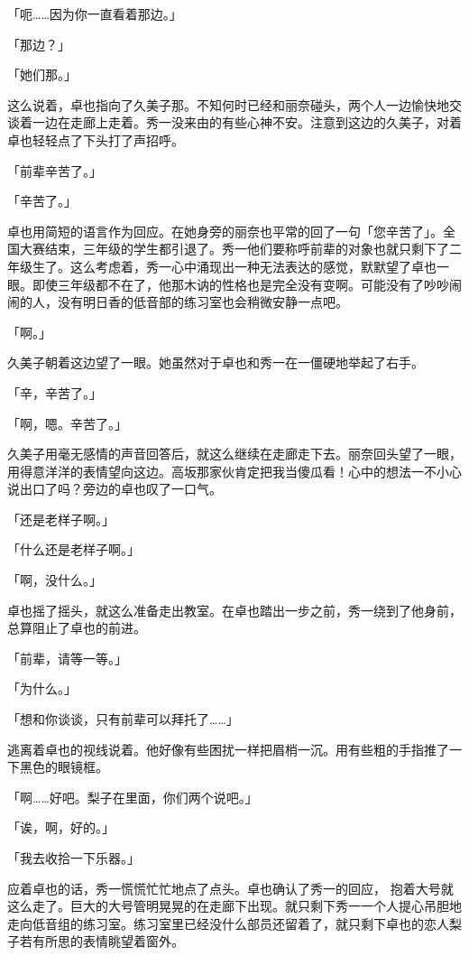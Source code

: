 \documentclass[UTF8]{ctexart}
\begin{document}
    「呃……因为你一直看着那边。」

    「那边？」

    「她们那。」

    这么说着，卓也指向了久美子那。不知何时已经和丽奈碰头，两个人一边愉快地交谈着一边在走廊上走着。秀一没来由的有些心神不安。注意到这边的久美子，对着卓也轻轻点了下头打了声招呼。

    「前辈辛苦了。」

    「辛苦了。」

    卓也用简短的语言作为回应。在她身旁的丽奈也平常的回了一句「您辛苦了」。全国大赛结束，三年级的学生都引退了。秀一他们要称呼前辈的对象也就只剩下了二年级生了。这么考虑着，秀一心中涌现出一种无法表达的感觉，默默望了卓也一眼。即使三年级都不在了，他那木讷的性格也是完全没有变啊。可能没有了吵吵闹闹的人，没有明日香的低音部的练习室也会稍微安静一点吧。

    「啊。」

    久美子朝着这边望了一眼。她虽然对于卓也和秀一在一僵硬地举起了右手。

    「辛，辛苦了。」

    「啊，嗯。辛苦了。」

    久美子用毫无感情的声音回答后，就这么继续在走廊走下去。丽奈回头望了一眼，用得意洋洋的表情望向这边。高坂那家伙肯定把我当傻瓜看！心中的想法一不小心说出口了吗？旁边的卓也叹了一口气。

    「还是老样子啊。」

    「什么还是老样子啊。」

    「啊，没什么。」

    卓也摇了摇头，就这么准备走出教室。在卓也踏出一步之前，秀一绕到了他身前，总算阻止了卓也的前进。

    「前辈，请等一等。」

    「为什么。」

    「想和你谈谈，只有前辈可以拜托了……」

    逃离着卓也的视线说着。他好像有些困扰一样把眉梢一沉。用有些粗的手指推了一下黑色的眼镜框。

    「啊……好吧。梨子在里面，你们两个说吧。」

    「诶，啊，好的。」

    「我去收拾一下乐器。」

    应着卓也的话，秀一慌慌忙忙地点了点头。卓也确认了秀一的回应， 抱着大号就这么走了。巨大的大号管明晃晃的在走廊下出现。就只剩下秀一一个人提心吊胆地走向低音组的练习室。练习室里已经没什么部员还留着了，就只剩下卓也的恋人梨子若有所思的表情眺望着窗外。
\end{document}
